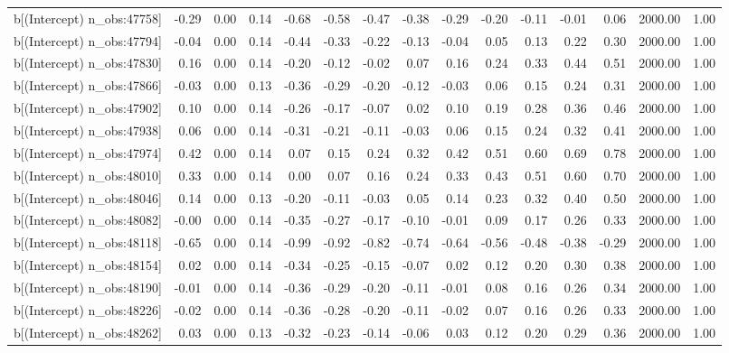 \begin{table}[ht]
\begin{tabular}{rrrrrrrrrrrrrrr}
  b[(Intercept) n\_obs:47758] & -0.29 & 0.00 & 0.14 & -0.68 & -0.58 & -0.47 & -0.38 & -0.29 & -0.20 & -0.11 & -0.01 & 0.06 & 2000.00 & 1.00 \\ 
  b[(Intercept) n\_obs:47794] & -0.04 & 0.00 & 0.14 & -0.44 & -0.33 & -0.22 & -0.13 & -0.04 & 0.05 & 0.13 & 0.22 & 0.30 & 2000.00 & 1.00 \\ 
  b[(Intercept) n\_obs:47830] & 0.16 & 0.00 & 0.14 & -0.20 & -0.12 & -0.02 & 0.07 & 0.16 & 0.24 & 0.33 & 0.44 & 0.51 & 2000.00 & 1.00 \\ 
  b[(Intercept) n\_obs:47866] & -0.03 & 0.00 & 0.13 & -0.36 & -0.29 & -0.20 & -0.12 & -0.03 & 0.06 & 0.15 & 0.24 & 0.31 & 2000.00 & 1.00 \\ 
  b[(Intercept) n\_obs:47902] & 0.10 & 0.00 & 0.14 & -0.26 & -0.17 & -0.07 & 0.02 & 0.10 & 0.19 & 0.28 & 0.36 & 0.46 & 2000.00 & 1.00 \\ 
  b[(Intercept) n\_obs:47938] & 0.06 & 0.00 & 0.14 & -0.31 & -0.21 & -0.11 & -0.03 & 0.06 & 0.15 & 0.24 & 0.32 & 0.41 & 2000.00 & 1.00 \\ 
  b[(Intercept) n\_obs:47974] & 0.42 & 0.00 & 0.14 & 0.07 & 0.15 & 0.24 & 0.32 & 0.42 & 0.51 & 0.60 & 0.69 & 0.78 & 2000.00 & 1.00 \\ 
  b[(Intercept) n\_obs:48010] & 0.33 & 0.00 & 0.14 & 0.00 & 0.07 & 0.16 & 0.24 & 0.33 & 0.43 & 0.51 & 0.60 & 0.70 & 2000.00 & 1.00 \\ 
  b[(Intercept) n\_obs:48046] & 0.14 & 0.00 & 0.13 & -0.20 & -0.11 & -0.03 & 0.05 & 0.14 & 0.23 & 0.32 & 0.40 & 0.50 & 2000.00 & 1.00 \\ 
  b[(Intercept) n\_obs:48082] & -0.00 & 0.00 & 0.14 & -0.35 & -0.27 & -0.17 & -0.10 & -0.01 & 0.09 & 0.17 & 0.26 & 0.33 & 2000.00 & 1.00 \\ 
  b[(Intercept) n\_obs:48118] & -0.65 & 0.00 & 0.14 & -0.99 & -0.92 & -0.82 & -0.74 & -0.64 & -0.56 & -0.48 & -0.38 & -0.29 & 2000.00 & 1.00 \\ 
  b[(Intercept) n\_obs:48154] & 0.02 & 0.00 & 0.14 & -0.34 & -0.25 & -0.15 & -0.07 & 0.02 & 0.12 & 0.20 & 0.30 & 0.38 & 2000.00 & 1.00 \\ 
  b[(Intercept) n\_obs:48190] & -0.01 & 0.00 & 0.14 & -0.36 & -0.29 & -0.20 & -0.11 & -0.01 & 0.08 & 0.16 & 0.26 & 0.34 & 2000.00 & 1.00 \\ 
  b[(Intercept) n\_obs:48226] & -0.02 & 0.00 & 0.14 & -0.36 & -0.28 & -0.20 & -0.11 & -0.02 & 0.07 & 0.16 & 0.26 & 0.33 & 2000.00 & 1.00 \\ 
  b[(Intercept) n\_obs:48262] & 0.03 & 0.00 & 0.13 & -0.32 & -0.23 & -0.14 & -0.06 & 0.03 & 0.12 & 0.20 & 0.29 & 0.36 & 2000.00 & 1.00 \\ 

\end{tabular}
\end{table}
